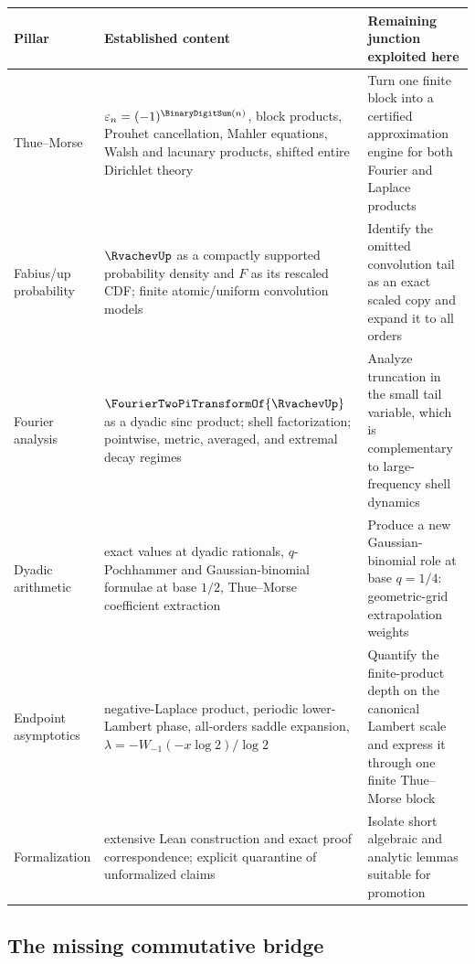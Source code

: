\documentclass[11pt,oneside]{article}
\numberwithin{equation}{section}
\theoremstyle{definition}
\theoremstyle{remark}
\newcommand{\eps}{\varepsilon}
\begin{document}
\begin{center}
\small
\begin{tabularx}{\textwidth}{@{}p{}X X@{}}
\toprule
Pillar & Established content & Remaining junction exploited here \\
\midrule
Thue--Morse & $\eps_n=(-1)^{\BinaryDigitSum(n)}$, block products, Prouhet cancellation, Mahler equations,
Walsh and lacunary products, shifted entire Dirichlet theory & Turn one finite block into a
certified approximation engine for both Fourier and Laplace products \\
Fabius/up probability & $\RvachevUp$ as a compactly supported probability density and $F$ as its
rescaled CDF; finite atomic/uniform convolution models & Identify the omitted convolution tail
as an exact scaled copy and expand it to all orders \\
Fourier analysis & $\FourierTwoPiTransformOf{\RvachevUp}$ as a dyadic sinc product; shell factorization; pointwise,
metric, averaged, and extremal decay regimes & Analyze truncation in the small tail variable,
which is complementary to large-frequency shell dynamics \\
Dyadic arithmetic & exact values at dyadic rationals, $q$-Pochhammer and Gaussian-binomial
formulae at base $1/2$, Thue--Morse coefficient extraction & Produce a new Gaussian-binomial
role at base $q=1/4$: geometric-grid extrapolation weights \\
Endpoint asymptotics & negative-Laplace product, periodic lower-Lambert phase, all-orders saddle
expansion, $\lambda=-W_{-1}(-x\log2)/\log2$ & Quantify the finite-product depth on the canonical
Lambert scale and express it through one finite Thue--Morse block \\
Formalization & extensive Lean construction and exact proof correspondence; explicit quarantine
of unformalized claims & Isolate short algebraic and analytic lemmas suitable for promotion \\
\bottomrule
\end{tabularx}
\end{center}

\subsection{The missing commutative bridge}
\end{document}
